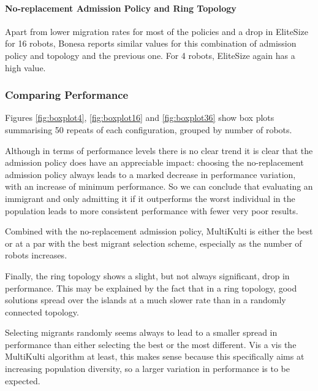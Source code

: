 \documentclass[runningheads]{llncs}
\begin{document}
\paragraph{No-replacement Admission Policy and Ring Topology}

Apart from lower migration rates for most of the policies and a drop in EliteSize for 16 robots, Bonesa reports similar values for this combination of admission policy and topology and the previous one. For 4 robots, EliteSize again has a high value.



\subsubsection{Comparing Performance}

Figures \ref{fig:boxplot4}, \ref{fig:boxplot16} and \ref{fig:boxplot36} show box plots summarising 50 repeats of each configuration, grouped by number of robots. 

Although in terms of performance levels there is no clear trend it is clear that the admission policy does have an appreciable impact: choosing the no-replacement admission policy always leads to a marked decrease in performance variation, with an increase of minimum performance. So we can conclude that evaluating an immigrant and only admitting it if it outperforms the worst individual in the population leads to more consistent performance with fewer very poor results.

Combined with the no-replacement admission policy, MultiKulti is
either the best or at a par with the best migrant selection scheme,
especially as the number of robots increases.  %

Finally, the ring topology shows a slight, but not always significant, drop in performance. This may be explained by the fact that in a ring topology, good solutions spread over the islands at a much slower rate than in a randomly connected topology.

Selecting migrants randomly seems always to lead to a smaller spread in performance than either selecting the best or the most different. Vis a vis the MultiKulti algorithm at least, this makes sense because this specifically aims at increasing population diversity, so a larger variation in performance is to be expected. 
\end{document}
